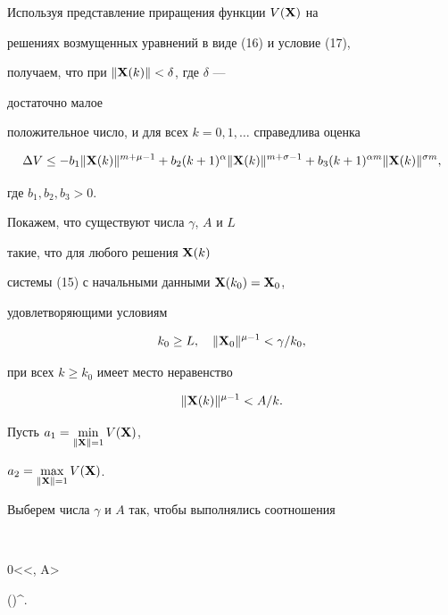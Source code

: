 \begin{pf}


Используя представление приращения функции $V(\bold X)$ на 


решениях возмущенных уравнений в виде (16) и условие (17),


получаем, что при $\|\bold X(k)\|<\delta$, где $\delta$ --- 


достаточно малое


положительное число, и для всех $k=0,1,\dotsc$ справедлива оценка


$$


\Delta V\leq -b_1 \|\bold X(k)\|^{m+\mu-1}+


b_2 (k+1)^\alpha \|\bold X(k)\|^{m+\sigma-1}+


b_3 (k+1)^{\alpha m} \|\bold X(k)\|^{\sigma m},


$$


где $b_1, b_2, b_3>0$.





Покажем, что существуют числа $\gamma$, $A$ и $L$


такие, что для любого решения $\bold X(k)$


системы (15) с начальными данными $\bold X(k_0)=\bold X_0$,


удовлетворяющими условиям


\begin{equation}


k_0\geq L,\quad \| \bold X_0\|^{\mu-1}<{\gamma}/{k_0},


\end{equation}


при всех $k\geq k_0$ имеет место неравенство


\begin{equation}


\| \bold X(k)\|^{\mu-1}<{A}/k.


\end{equation}





Пусть $a_1=\min\limits_{\|\bold X\|=1} V(\bold X)$,


$a_2=\max\limits_{\|\bold X\|=1} V(\bold X)$.


Выберем числа $\gamma$ и $A$ так, чтобы выполнялись соотношения


$$


0<\gamma<, \quad A> 


\bigg(\bigg)^{}.



\end{pf}

